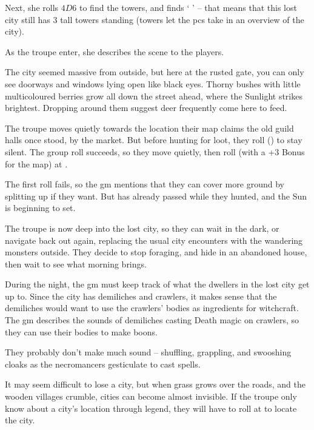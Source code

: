 \begin{multicols}{2}
\begin{exampletext}
  Next, she rolls $4D6$ to find the towers, and finds `   ' -- that means that this lost city still has 3 tall towers standing
  (towers let the \glspl{pc} take in an overview of the city).

  As the troupe enter, she describes the scene to the players.

  \begin{boxtext}
    The city seemed massive from outside, but here at the rusted gate, you can only see doorways and windows lying open like black eyes.
    Thorny bushes with little multicoloured berries grow all down the street ahead, where the Sunlight strikes brightest.
    Dropping around them suggest deer frequently come here to feed.
  \end{boxtext}

  The troupe moves quietly towards the location their map claims the old guild halls once stood, by the market.
  But before hunting for loot, they roll  (\tn[8]) to stay silent.
  The group roll succeeds, so they move quietly, then roll  (with a +3 Bonus for the map) at \tn[12].

  The first roll fails, so the \gls{gm} mentions that they can cover more ground by splitting up if they want.
  But  has already passed while they hunted, and the Sun is beginning to set.

  The troupe is now deep into the lost city, so they can wait in the dark, or navigate back out again, replacing the usual city encounters with the wandering monsters outside.
  They decide to stop foraging, and hide in an abandoned house, then wait to see what morning brings.

  During the night, the \gls{gm} must keep track of what the dwellers in the lost city get up to.
  Since the city has demiliches and \glspl{crawler}, it makes sense that the demiliches would want to use the \glspl{crawler}' bodies as \glspl{ingredient} for \gls{witchcraft}.
  The \gls{gm} describes the sounds of demiliches casting Death magic on \glspl{crawler}, so they can use their bodies to make \glspl{boon}.

  They probably don't make much sound -- shuffling, grappling, and swooshing cloaks as the necromancers gesticulate to cast spells.

\end{exampletext}


It may seem difficult to lose a city, but when grass grows over the roads, and the wooden \glspl{village} crumble, cities can become almost invisible.
If the troupe only know about a city's location through legend, they will have to roll  at \tn[14] to locate the city.


\end{multicols}
